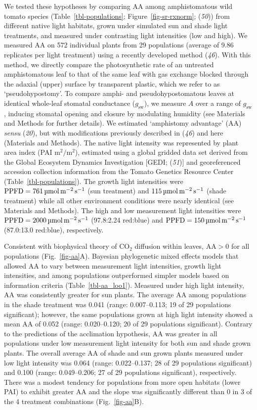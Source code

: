 \documentclass[
  letterpaper,
  DIV=11,
  numbers=noendperiod]{scrartcl}
\newcommand{\aax}{$\mathrm{AA}$}
\newcommand{\aay}{\mathrm{AA}}
\newcommand{\gsw}{$g_\text{sw}$}
\newcommand{\ppfdequals}[1]{$\mathrm{PPFD} = \qty{#1}{\micro\mol\raiseto{-2}\meter\raiseto{-1}\second}$}
\newcommand{\ppfdqty}[1]{$\qty{#1}{\micro\mol\raiseto{-2}\meter\raiseto{-1}\second}$}
\begin{document}
We tested these hypotheses by comparing \aax{} among amphistomatous wild
tomato species (Table~\ref{tbl-populations}; Figure~\ref{fig-sr-rxnorm};
(\emph{50})) from different native light habitats, grown under simulated
sun and shade light treatments, and measured under contrasting light
intensities (low and high). We measured \aax{} on 572 individual plants
from 29 populations (average of 9.86 replicates per light treatment)
using a recently developed method (\emph{46}). With this method, we
directly compare the photosynthetic rate of an untreated amphistomatous
leaf to that of the same leaf with gas exchange blocked through the
adaxial (upper) surface by transparent plastic, which we refer to as
`pseudohypostomy'. To compare amphi- and pseudohypostomatous leaves at
identical whole-leaf stomatal conductance (\gsw), we measure \(A\) over
a range of \gsw, inducing stomatal opening and closure by modulating
humidity (see Materials and Methods for further details). We estimated
`amphistomy advantage' (\aax) \emph{sensu} (\emph{20}), but with
modifications previously described in (\emph{46}) and here (Materials
and Methods). The native light intensity was represented by plant area
index (PAI \(\unit{\meter\squared\per\meter\squared}\)), estimated using
a global gridded data set derived from the Global Ecosystem Dynamics
Investigation {[}GEDI; (\emph{51}){]} and georeferenced accession
collection information from the Tomato Genetics Resource Center
(Table~\ref{tbl-populations}). The growth light intensities were
\ppfdequals{761} (sun treatment) and \ppfdqty{115} (shade treatment)
while all other environment conditions were nearly identical (see
Materials and Methods). The high and low measurement light intensities
were \ppfdequals{2000} (97.8:2.24 red:blue) and \ppfdequals{150}
(87.0:13.0 red:blue), respectively.

Consistent with biophysical theory of CO\(_2\) diffusion within leaves,
\(\aay{} > 0\) for all populations (Fig.~\ref{fig-aa}A). Bayesian
phylogenetic mixed effects models that allowed \aax{} to vary between
measurement light intensities, growth light intensities, and among
populations outperformed simpler models based on information criteria
(Table~\ref{tbl-aa_loo1}). Measured under high light intensity, \aax{}
was consistently greater for sun plants. The average \aax{} among
populations in the shade treatment was 0.041 (range: 0.007--0.113; 19 of
29 populations significant); however, the same populations grown at high
light intensity showed a mean \aax{} of 0.052 (range: 0.020--0.120; 20
of 29 populations significant). Contrary to the predictions of the
acclimation hypothesis, \aax{} was greater in all populations under low
measurement light intensity for both sun and shade grown plants. The
overall average \aax{} of shade and sun grown plants measured under low
light intensity was 0.064 (range: 0.022--0.137; 28 of 29 populations
significant) and 0.100 (range: 0.049--0.206; 27 of 29 populations
significant), respectively. There was a modest tendency for populations
from more open habitats (lower PAI) to exhibit greater \aax{} and the
slope was significantly different than 0 in 3 of the 4 treatment
combinations (Fig.~\ref{fig-aa}B).
\end{document}
